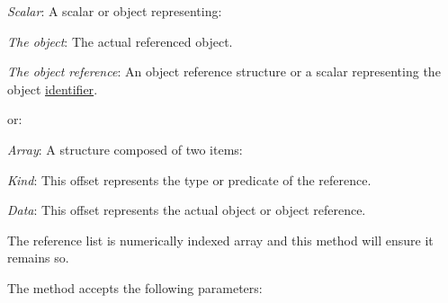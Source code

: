 \begin{DoxyItemize}
\item {\itshape Scalar}\-: A scalar or object representing\-: 
\begin{DoxyItemize}
\item {\itshape The object}\-: The actual referenced object. 
\item {\itshape The object reference}\-: An object reference structure or a scalar representing the object \hyperlink{}{identifier}. 
\end{DoxyItemize}or\-: 
\item {\itshape Array}\-: A structure composed of two items\-: 
\begin{DoxyItemize}
\item {\itshape Kind}\-: This offset represents the type or predicate of the reference. 
\item {\itshape Data}\-: This offset represents the actual object or object reference. 
\end{DoxyItemize}
\end{DoxyItemize}

The reference list is numerically indexed array and this method will ensure it remains so.

The method accepts the following parameters\-:


